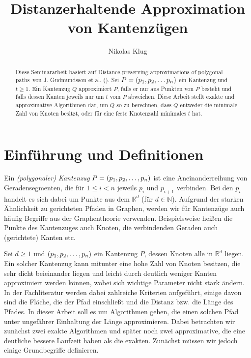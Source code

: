 \documentclass[11pt]{article}
\title{Distanzerhaltende Approximation von Kantenzügen}
\author{Nikolas Klug}
\newcommand{\R}{\mathbb{R}}
\begin{document}
    \maketitle

    \begin{abstract}
        Diese Seminararbeit basiert auf \glqq Distance-preserving approximations of polygonal paths\grqq\ von J. Gudmundsson et al. (\cite{gudmundsson}). Sei $P = (p_1, p_2, \mathellipsis p_n)$ ein Kantenzug und $t \geq 1$. Ein Kantenzug $Q$ approximiert $P$, falls er nur aus Punkten von $P$ besteht und falls dessen Kanten jeweils nur um $t$ vom $P$ abweichen. Diese Arbeit stellt exakte und approximative Algorithmen dar, um $Q$ so zu berechnen, dass $Q$ entweder die minimale Zahl von Knoten besitzt, oder für eine feste Knotenzahl minimales $t$ hat.
    \end{abstract}

    \section{Einführung und Definitionen}
    \label{sec:intro}

	Ein \emph{(polygonaler) Kantenzug} $P = (p_1, p_2, \mathellipsis, p_n)$ ist eine Aneinanderreihung von Geradensegmenten, die für $1 \leq i < n$ jeweils $p_i$ und $p_{i+1}$ verbinden. Bei den $p_i$ handelt es sich dabei um Punkte aus dem $\R^d$ (für $d \in \mathbb{N}$). Aufgrund der starken Ähnlichkeit zu gerichteten Pfaden in Graphen, werden wir für Kantenzüge auch häufig Begriffe aus der Graphentheorie verwenden. Beispielsweise heißen die Punkte des Kantenzuges  auch Knoten, die verbindenden Geraden auch (gerichtete) Kanten etc.

    Sei $d\geq1$ und $(p_1, p_2, \mathellipsis, p_n)$ ein Kantenzug $P$, dessen Knoten alle in $\R^{d}$ liegen.
    Ein solcher Kantenzug kann mitunter eine hohe Zahl von Knoten besitzen, die sehr dicht beieinander liegen und leicht durch deutlich weniger Kanten approximiert werden können, wobei sich wichtige Parameter nicht stark ändern. In der Fachliteratur werden dabei zahlreiche Kriterien aufgeführt, einige davon sind die Fläche, die der Pfad einschließt und die Distanz bzw. die Länge des Pfades. In dieser Arbeit soll es um Algorithmen gehen, die einen solchen Pfad unter ungefährer Einhaltung der Länge approximieren. Dabei betrachten wir zunächst zwei exakte Algorithmen und später noch zwei approximative, die eine deutliche bessere Laufzeit haben als die exakten. Zunächst müssen wir jedoch einige Grundbegriffe definieren.
   
\end{document}
